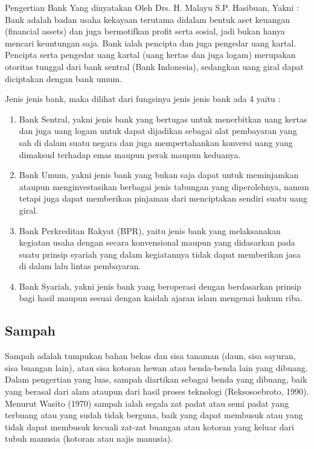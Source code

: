 Pengertian Bank Yang dinyatakan Oleh Drs. H. Malayu S.P. Hasibuan, Yakni :
Bank adalah badan usaha kekayaan terutama didalam bentuk aset keuangan (financial assets) dan juga bermotifkan profit serta sosial, jadi bukan hanya mencari keuntungan saja. Bank ialah pencipta dan juga pengedar uang kartal. Pencipta serta pengedar uang kartal (uang kertas dan juga logam) merupakan otoritas tunggal dari bank sentral (Bank Indonesia), sedangkan uang giral dapat diciptakan dengan bank umum.

Jenis jenis bank, maka dilihat dari fungsinya jenis jenis bank ada 4 yaitu :

\begin{enumerate}
	\item Bank Sentral, yakni jenis bank yang bertugas untuk menerbitkan uang kertas dan juga uang logam untuk dapat dijadikan sebagai alat pembayaran yang sah di dalam suatu negara dan juga mempertahankan konversi uang yang dimaksud terhadap emas maupun perak maupun keduanya.
	\item Bank Umum, yakni jenis bank yang bukan saja dapat untuk meminjamkan ataupun menginvestasikan berbagai jenis tabungan yang diperolehnya, namun tetapi juga dapat memberikan pinjaman dari menciptakan sendiri suatu uang giral.
	\item Bank Perkreditan Rakyat (BPR), yaitu jenis bank yang melaksanakan kegiatan usaha dengan secara konvensional maupun yang didasarkan pada suatu prinsip syariah yang dalam kegiatannya tidak dapat memberikan jasa di dalam lalu lintas pembayaran.
	\item Bank Syariah, yakni jenis bank yang  beroperasi dengan berdasarkan prinsip bagi hasil maupun sesuai dengan kaidah ajaran islam mengenai hukum riba.
\end{enumerate}

\subsection{Sampah}
Sampah adalah tumpukan bahan bekas dan sisa tanaman (daun, sisa sayuran, sisa buangan lain), atau sisa kotoran hewan atau benda-benda lain yang dibuang. Dalam pengertian yang luas, sampah diartikan sebagai benda yang dibuang, baik yang berasal dari alam ataupun dari hasil proses teknologi (Reksosoebroto, 1990). Menurut Wasito (1970) sampah ialah segala zat padat atau semi padat yang terbuang atau yang sudah tidak berguna, baik yang dapat membusuk atau yang tidak dapat membusuk kecuali zat-zat buangan atau kotoran yang keluar dari tubuh manusia (kotoran atau najis manusia).

